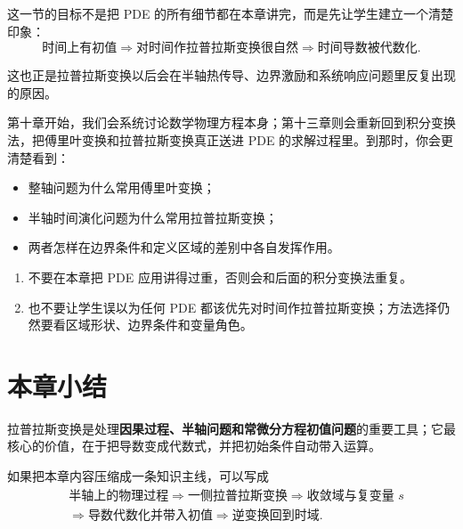 \begin{tishi}[这一节的真正作用]
这一节的目标不是把 PDE 的所有细节都在本章讲完，而是先让学生建立一个清楚印象：
\[
    \text{时间上有初值}
    \Longrightarrow
    \text{对时间作拉普拉斯变换很自然}
    \Longrightarrow
    \text{时间导数被代数化}.
\]

这也正是拉普拉斯变换以后会在半轴热传导、边界激励和系统响应问题里反复出现的原因。
\end{tishi}

\begin{tishi}[和后续章节的衔接]
第十章开始，我们会系统讨论数学物理方程本身；第十三章则会重新回到积分变换法，把傅里叶变换和拉普拉斯变换真正送进 PDE 的求解过程里。到那时，你会更清楚看到：
\begin{itemize}
    \item 整轴问题为什么常用傅里叶变换；
    \item 半轴时间演化问题为什么常用拉普拉斯变换；
    \item 两者怎样在边界条件和定义区域的差别中各自发挥作用。
\end{itemize}
\end{tishi}

\begin{jinshi}[这里需要控制的分寸]
\begin{enumerate}
    \item 不要在本章把 PDE 应用讲得过重，否则会和后面的积分变换法重复。
    \item 也不要让学生误以为任何 PDE 都该优先对时间作拉普拉斯变换；方法选择仍然要看区域形状、边界条件和变量角色。
\end{enumerate}
\end{jinshi}

\section{本章小结}

\begin{tishi}[一句话回看本章]
拉普拉斯变换是处理\textbf{因果过程、半轴问题和常微分方程初值问题}的重要工具；它最核心的价值，在于把导数变成代数式，并把初始条件自动带入运算。
\end{tishi}

如果把本章内容压缩成一条知识主线，可以写成
\[
    \begin{aligned}
        &\text{半轴上的物理过程}
        \Longrightarrow
        \text{一侧拉普拉斯变换}
        \Longrightarrow
        \text{收敛域与复变量 $s$} \\
        &\Longrightarrow
        \text{导数代数化并带入初值}
        \Longrightarrow
        \text{逆变换回到时域}.
    \end{aligned}
\]

